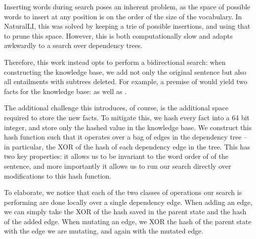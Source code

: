 
%
%
Inserting words during search poses an inherent problem, 
  as the space of possible words to insert at any
  position is on the order of the size of the vocabulary.
In NaturalLI, this was solved by keeping a trie of possible insertions, and
  using that to prune this space.
However, this is both computationally slow and adapts awkwardly to a search over
  dependency trees.

Therefore, this work instead opts to perform a bidirectional search:
  when constructing the knowledge base, we add not only the original sentence but
  also all entailments with subtrees deleted.
For example, a premise of  would yield two facts
  for the knowledge base:  as well as .

The additional challenge this introduces, of course, is the additional space required
  to store the new facts.
To mitigate this, we hash every fact into a 64 bit integer, and store only the hashed 
  value in the knowledge base.
We construct this hash function such that it operates over a bag of edges in the
  dependency tree -- in particular, the XOR of the hash of each dependency edge in
  the tree.
This has two key properties: it allows us to be invariant to the word order of
  of the sentence, and more importantly it allows us to run our search directly
  over modifications to this hash function.

To elaborate, we notice that each of the two classes of operations our search is
  performing are done locally over a single dependency edge.
When adding an edge, we can simply take the XOR of the hash saved in the 
  parent state and the hash of the added edge.
When mutating an edge, we XOR the hash of the parent state with the edge we are
  mutating, and again with the mutated edge.

